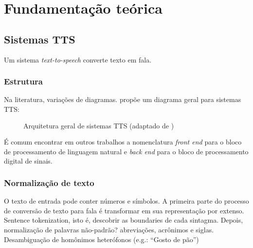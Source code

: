 

\chapter{Fundamentação teórica}
\section{Sistemas TTS}
Um sistema \emph{text-to-speech} converte texto em fala.
\subsection{Estrutura}
Na literatura, variações de diagramas.  propõe um
diagrama geral para sistemas TTS:

\begin{figure}[!htbp]
\centering
{}
\caption{Arquitetura geral de sistemas TTS (adaptado de )}
\label{fig:tts-arch}
\end{figure}

É comum encontrar em outros trabalhos a nomenclatura \emph{front end} para o
bloco de processamento de linguagem natural e \emph{back end} para o bloco de
processamento digital de sinais.

\subsection{Normalização de texto}
O texto de entrada pode conter números e símbolos. A primeira parte do processo de conversão de texto para fala é transformar em sua representação por extenso.
Sentence tokenization, isto é, descobrir as boundaries de cada sintagma. Depois,
normalização de palavras não-padrão? abreviações, acrônimos e siglas.
Desambiguação de homônimos heterófonos (e.g.: ``Gosto de pão'')

